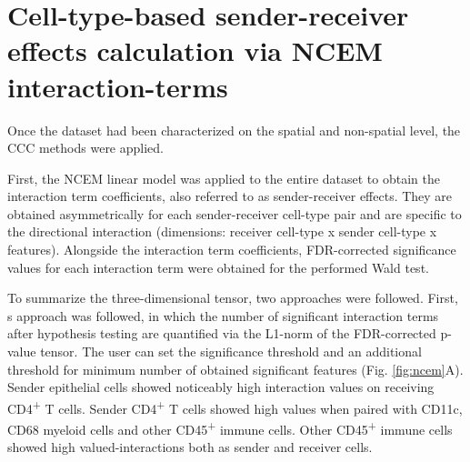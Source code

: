 \pagebreak


\section{Cell-type-based sender-receiver effects calculation via NCEM interaction-terms}

Once the dataset had been characterized on the spatial and non-spatial level, the CCC methods were applied.

First, the NCEM linear model was applied to the entire dataset to obtain the interaction term coefficients, also referred to as sender-receiver effects. They are obtained asymmetrically for each sender-receiver cell-type pair and are specific to the directional interaction (dimensions: receiver cell-type x sender cell-type x features). Alongside the interaction term coefficients, FDR-corrected significance values for each interaction term were obtained for the performed Wald test.

To summarize the three-dimensional tensor, two approaches were followed. First, \cite{Fischer-2022}s approach was followed, in which the number of significant interaction terms after hypothesis testing are quantified via the L1-norm of the FDR-corrected p-value tensor. The user can set the significance threshold and an additional threshold for minimum number of obtained significant features (Fig. \ref{fig:ncem}A). Sender epithelial cells showed noticeably high interaction values on receiving CD4\textsuperscript{+} T cells. Sender CD4\textsuperscript{+} T cells showed high values when paired with CD11c, CD68 myeloid cells and other CD45\textsuperscript{+} immune cells. Other CD45\textsuperscript{+} immune cells showed high valued-interactions both as sender and receiver cells.

